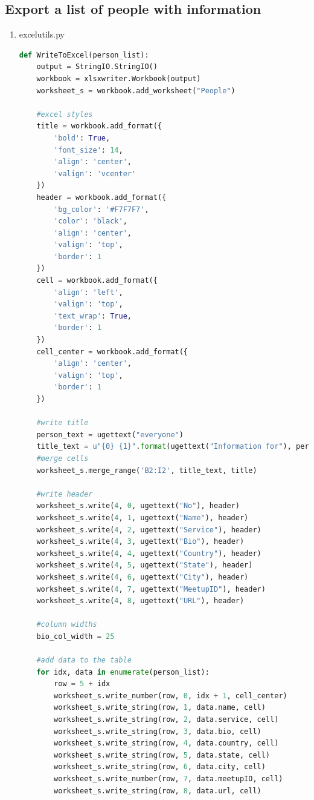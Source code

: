\documentclass[letterpaper,10pt,onecolumn]{IEEEtran} %
\begin{document}
\subsection{Export a list of people with information}

\begin{enumerate}
\item excelutils.py
\begin{center}
\begin{lstlisting}[language=Python]
def WriteToExcel(person_list):
    output = StringIO.StringIO()
    workbook = xlsxwriter.Workbook(output)
    worksheet_s = workbook.add_worksheet("People")

    #excel styles
    title = workbook.add_format({
        'bold': True,
        'font_size': 14,
        'align': 'center',
        'valign': 'vcenter'
    })
    header = workbook.add_format({
        'bg_color': '#F7F7F7',
        'color': 'black',
        'align': 'center',
        'valign': 'top',
        'border': 1
    })
    cell = workbook.add_format({
        'align': 'left',
        'valign': 'top',
        'text_wrap': True,
        'border': 1
    })
    cell_center = workbook.add_format({
        'align': 'center',
        'valign': 'top',
        'border': 1
    })

    #write title
    person_text = ugettext("everyone")
    title_text = u"{0} {1}".format(ugettext("Information for"), person_text)
    #merge cells
    worksheet_s.merge_range('B2:I2', title_text, title)

    #write header
    worksheet_s.write(4, 0, ugettext("No"), header)
    worksheet_s.write(4, 1, ugettext("Name"), header)
    worksheet_s.write(4, 2, ugettext("Service"), header)
    worksheet_s.write(4, 3, ugettext("Bio"), header)
    worksheet_s.write(4, 4, ugettext("Country"), header)
    worksheet_s.write(4, 5, ugettext("State"), header)
    worksheet_s.write(4, 6, ugettext("City"), header)
    worksheet_s.write(4, 7, ugettext("MeetupID"), header)
    worksheet_s.write(4, 8, ugettext("URL"), header)

    #column widths
    bio_col_width = 25

    #add data to the table
    for idx, data in enumerate(person_list):
        row = 5 + idx
        worksheet_s.write_number(row, 0, idx + 1, cell_center)
        worksheet_s.write_string(row, 1, data.name, cell)
        worksheet_s.write_string(row, 2, data.service, cell)
        worksheet_s.write_string(row, 3, data.bio, cell)
        worksheet_s.write_string(row, 4, data.country, cell)
        worksheet_s.write_string(row, 5, data.state, cell)
        worksheet_s.write_string(row, 6, data.city, cell)
        worksheet_s.write_number(row, 7, data.meetupID, cell)
        worksheet_s.write_string(row, 8, data.url, cell)


\end{lstlisting}
\end{center}
\end{enumerate}
\end{document}
